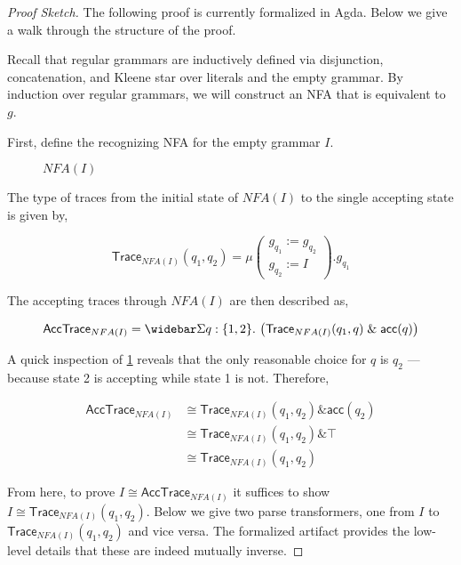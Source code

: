 \documentclass[acmsmall,screen,nonacm]{acmart}
\newcommand{\LinSigTy}[3]{\widebar\Sigma #1 : #2.\, #3}
\newcommand{\amp}{\mathrel{\&}}
\begin{document}
\begin{proof}[Proof Sketch]
  The following proof is currently formalized in Agda. Below
  we give a walk through the structure of the proof.

  Recall that regular grammars are inductively defined via
  disjunction, concatenation, and Kleene star over literals
  and the empty grammar. By induction over regular grammars,
  we will construct an NFA that is equivalent to $g$.

  First, define the recognizing NFA for the empty grammar
  $I$.

  \begin{figure}[h!]
  \caption{$NFA(I)$}
  \label{fig:emptyNFA}
  \end{figure}

  The type of traces from the initial state of $NFA(I)$ to the single
  accepting state is given by,

  \[
    \mathsf{Trace}_{NFA(I)}(q_{1}, q_{2}) = \mu
      \begin{pmatrix}
         g_{q_{1}} := g_{q_{2}} \\
         g_{q_{2}} := I
      \end{pmatrix}. g_{q_{1}}
  \]

  The accepting traces through $NFA(I)$ are then described
  as,

  \[
    \mathsf{AccTrace}_{NFA(I)} = \LinSigTy q {\{1 , 2\}} {\left( \mathsf{Trace}_{NFA(I)}(q_{1} , q) \amp \mathsf{acc}(q) \right)}
  \]

  A quick inspection of \cref{fig:emptyNFA} reveals that the
  only reasonable choice for $q$ is $q_{2}$ --- because
  state 2 is accepting while state 1 is not. Therefore,

  \begin{align*}
    \mathsf{AccTrace}_{NFA(I)}
    & \cong \mathsf{Trace}_{NFA(I)}(q_{1} , q_{2}) \amp \mathsf{acc}(q_{2}) \\
    & \cong \mathsf{Trace}_{NFA(I)}(q_{1} , q_{2}) \amp \top \\
    & \cong \mathsf{Trace}_{NFA(I)}(q_{1} , q_{2})
  \end{align*}

  From here, to prove
  $I \cong \mathsf{AccTrace}_{NFA(I)}$ it suffices to show
  $I \cong \mathsf{Trace}_{NFA(I)}(q_{1} , q_{2})$. Below we
  give two parse transformers, one from $I$ to
  $\mathsf{Trace}_{NFA(I)}(q_{1} , q_{2})$ and vice versa. The formalized
  artifact provides the low-level details that these are
  indeed mutually inverse.


\end{proof}
\end{document}
